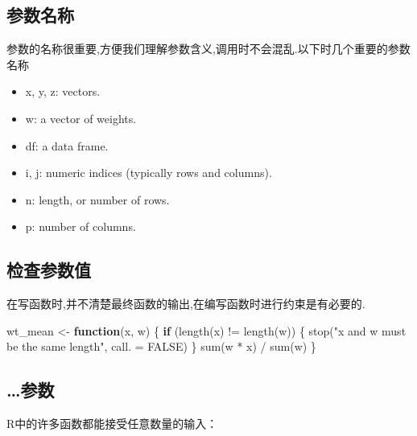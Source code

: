 \documentclass[
]{book}
\newenvironment{Shaded}{\begin{snugshade}}{\end{snugshade}}
\newcommand{\AttributeTok}[1]{\textcolor[rgb]{0.77,0.63,0.00}{#1}}
\newcommand{\ConstantTok}[1]{\textcolor[rgb]{0.00,0.00,0.00}{#1}}
\newcommand{\ControlFlowTok}[1]{\textcolor[rgb]{0.13,0.29,0.53}{\textbf{#1}}}
\newcommand{\FunctionTok}[1]{\textcolor[rgb]{0.00,0.00,0.00}{#1}}
\newcommand{\NormalTok}[1]{#1}
\newcommand{\OtherTok}[1]{\textcolor[rgb]{0.56,0.35,0.01}{#1}}
\newcommand{\SpecialCharTok}[1]{\textcolor[rgb]{0.00,0.00,0.00}{#1}}
\newcommand{\StringTok}[1]{\textcolor[rgb]{0.31,0.60,0.02}{#1}}
\providecommand{\tightlist}{%
  \setlength{\itemsep}{0pt}\setlength{\parskip}{0pt}}
\begin{document}
\hypertarget{ux53c2ux6570ux540dux79f0}{%
\subsection{参数名称}\label{ux53c2ux6570ux540dux79f0}}

参数的名称很重要,方便我们理解参数含义,调用时不会混乱.以下时几个重要的参数名称

\begin{itemize}
\tightlist
\item
  x, y, z: vectors.
\item
  w: a vector of weights.
\item
  df: a data frame.
\item
  i, j: numeric indices (typically rows and columns).
\item
  n: length, or number of rows.
\item
  p: number of columns.
\end{itemize}

\hypertarget{ux68c0ux67e5ux53c2ux6570ux503c}{%
\subsection{检查参数值}\label{ux68c0ux67e5ux53c2ux6570ux503c}}

在写函数时,并不清楚最终函数的输出,在编写函数时进行约束是有必要的.

\begin{Shaded}
\begin{Highlighting}[]
\NormalTok{wt\_mean }\OtherTok{\textless{}{-}} \ControlFlowTok{function}\NormalTok{(x, w) \{}
  \ControlFlowTok{if}\NormalTok{ (}\FunctionTok{length}\NormalTok{(x) }\SpecialCharTok{!=} \FunctionTok{length}\NormalTok{(w)) \{}
    \FunctionTok{stop}\NormalTok{(}\StringTok{"\textasciigrave{}x\textasciigrave{} and \textasciigrave{}w\textasciigrave{} must be the same length"}\NormalTok{, }\AttributeTok{call. =} \ConstantTok{FALSE}\NormalTok{)}
\NormalTok{  \}}
  \FunctionTok{sum}\NormalTok{(w }\SpecialCharTok{*}\NormalTok{ x) }\SpecialCharTok{/} \FunctionTok{sum}\NormalTok{(w)}
\NormalTok{\}}
\end{Highlighting}
\end{Shaded}

\hypertarget{ux53c2ux6570}{%
\subsection{\ldots 参数}\label{ux53c2ux6570}}

R中的许多函数都能接受任意数量的输入：
\end{document}
